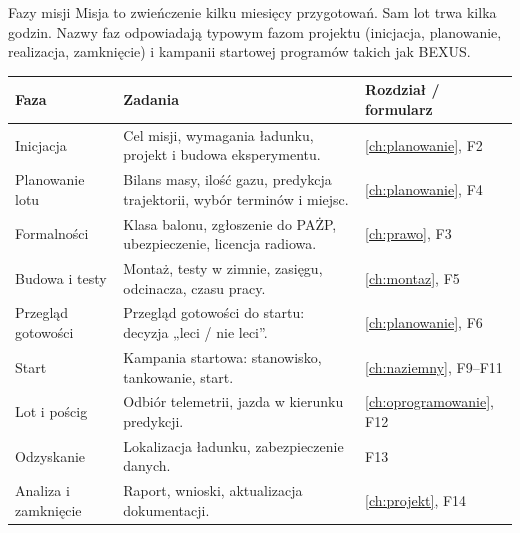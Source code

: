 \begin{sekcja}{Fazy misji}
Misja to zwieńczenie kilku miesięcy przygotowań. Sam lot trwa kilka godzin. Nazwy faz odpowiadają typowym fazom projektu (inicjacja, planowanie, realizacja, zamknięcie) i kampanii startowej programów takich jak BEXUS.

\renewcommand{\arraystretch}{1.35}
\begin{tabularx}{\linewidth}{@{}P{30mm}LP{36mm}@{}}
\toprule
\textbf{Faza} & \textbf{Zadania} & \textbf{Rozdział / formularz}\\\midrule
Inicjacja & Cel misji, wymagania ładunku, projekt i budowa eksperymentu. & \ref{ch:planowanie}, F2\\
Planowanie lotu & Bilans masy, ilość gazu, predykcja trajektorii, wybór terminów i miejsc. & \ref{ch:planowanie}, F4\\
Formalności & Klasa balonu, zgłoszenie do PAŻP, ubezpieczenie, licencja radiowa. & \ref{ch:prawo}, F3\\
Budowa i testy & Montaż, testy w zimnie, zasięgu, odcinacza, czasu pracy. & \ref{ch:montaz}, F5\\
Przegląd gotowości & Przegląd gotowości do startu: decyzja „leci / nie leci”. & \ref{ch:planowanie}, F6\\
Start & Kampania startowa: stanowisko, tankowanie, start. & \ref{ch:naziemny}, F9--F11\\
Lot i pościg & Odbiór telemetrii, jazda w kierunku predykcji. & \ref{ch:oprogramowanie}, F12\\
Odzyskanie & Lokalizacja ładunku, zabezpieczenie danych. & F13\\
Analiza i zamknięcie & Raport, wnioski, aktualizacja dokumentacji. & \ref{ch:projekt}, F14\\
\bottomrule
\end{tabularx}
\end{sekcja}
